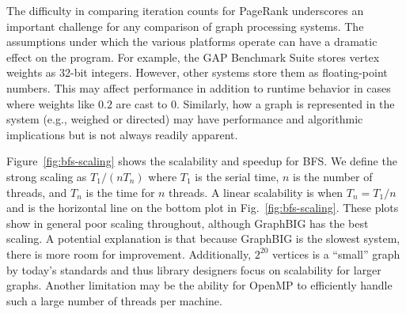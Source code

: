 \documentclass{llncs}
\begin{document}
The difficulty in comparing iteration counts for PageRank underscores an important challenge for any comparison of graph processing systems. The assumptions under which the various platforms operate can have a dramatic effect on the program. For example, the GAP Benchmark Suite stores vertex weights as 32-bit integers. However, other systems store them as floating-point numbers. This may affect performance in addition to runtime behavior in cases where weights like $0.2$ are cast to $0$. Similarly, how a graph is represented in the system (e.g., weighed or directed) may have performance and algorithmic implications but is not always readily apparent.

Figure~\ref{fig:bfs-scaling} shows the scalability and speedup for BFS. We define the strong scaling as $T_1 / (n T_n)$ where $T_1$ is the serial time, $n$ is the number of threads, and $T_n$ is the time for $n$ threads. A linear scalability is when $T_n = T_1/n$ and is the horizontal line on the bottom plot in Fig.~\ref{fig:bfs-scaling}. These plots show in general poor scaling throughout, although GraphBIG has the best scaling. A potential explanation is that because GraphBIG is the slowest system, there is more room for improvement. Additionally, $2^{20}$ vertices is a ``small'' graph by today's standards and thus library designers focus on scalability for larger graphs. Another limitation may be the ability for OpenMP to efficiently handle such a large number of threads per machine.
\end{document}
